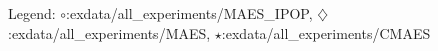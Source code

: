 Legend: {\color{CornflowerBlue}$\circ$}:exdata/all\_experiments/MAES\_IPOP, {\color{Orange}$\diamondsuit$}:exdata/all\_experiments/MAES, {\color{Green}$\star$}:exdata/all\_experiments/CMAES